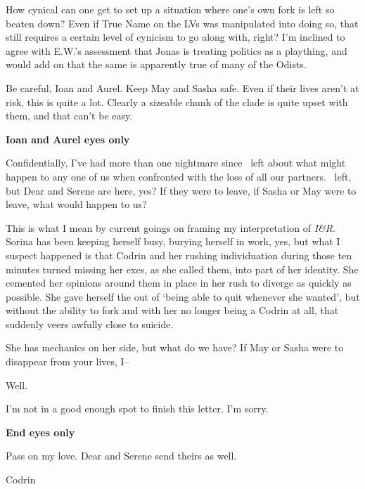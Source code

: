 How cynical can one get to set up a situation where one's own fork is left so beaten down? Even if True Name on the LVs was manipulated into doing so, that still requires a certain level of cynicism to go along with, right? I'm inclined to agree with E.W.'s assessment that Jonas is treating politics as a plaything, and would add on that the same is apparently true of many of the Odists.

Be careful, Ioan and Aurel. Keep May and Sasha safe. Even if their lives aren't at risk, this is quite a lot. Clearly a sizeable chunk of the clade is quite upset with them, and that can't be easy.

\textbf{Ioan and Aurel eyes only}

Confidentially, I've had more than one nightmare since \Partner\ left about what might happen to any one of us when confronted with the loss of all our partners. \Partner\ left, but Dear and Serene are here, yes? If they were to leave, if Sasha or May were to leave, what would happen to us?

This is what I mean by current goings on framing my interpretation of \emph{I\&R}. Sorina has been keeping herself busy, burying herself in work, yes, but what I suspect happened is that Codrin and her rushing individuation during those ten minutes turned missing her exes, as she called them, into part of her identity. She cemented her opinions around them in place in her rush to diverge as quickly as possible. She gave herself the out of `being able to quit whenever she wanted', but without the ability to fork and with her no longer being a Codrin at all, that suddenly veers awfully close to suicide.

She has mechanics on her side, but what do we have? If May or Sasha were to disappear from your lives, I--

Well.

I'm not in a good enough spot to finish this letter. I'm sorry.

\textbf{End eyes only}

Pass on my love. Dear and Serene send theirs as well.

Codrin
